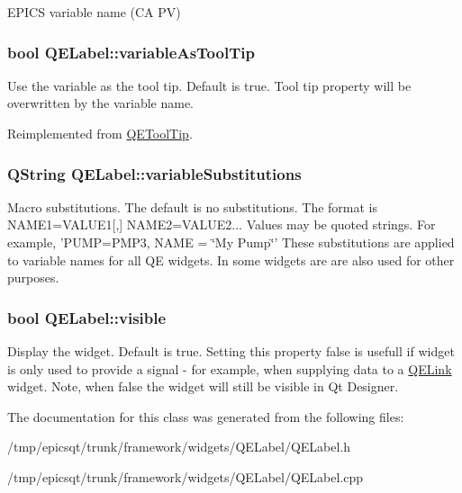 \label{classQELabel_a3ca3590d22697395ec79c29335987ed3}
EPICS variable name (CA PV) \hypertarget{classQELabel_a2729739c10c45d2c5462815dd32b194e}{
\subsubsection[{variableAsToolTip}]{\setlength{\rightskip}{0pt plus 5cm}bool QELabel::variableAsToolTip}}
\label{classQELabel_a2729739c10c45d2c5462815dd32b194e}
Use the variable as the tool tip. Default is true. Tool tip property will be overwritten by the variable name. 

Reimplemented from \hyperlink{classQEToolTip}{QEToolTip}.

\hypertarget{classQELabel_aeece637752023b268141770905bd3fa4}{
\subsubsection[{variableSubstitutions}]{\setlength{\rightskip}{0pt plus 5cm}QString QELabel::variableSubstitutions}}
\label{classQELabel_aeece637752023b268141770905bd3fa4}
Macro substitutions. The default is no substitutions. The format is NAME1=VALUE1\mbox{[},\mbox{]} NAME2=VALUE2... Values may be quoted strings. For example, 'PUMP=PMP3, NAME = \char`\"{}My Pump\char`\"{}' These substitutions are applied to variable names for all QE widgets. In some widgets are are also used for other purposes. \hypertarget{classQELabel_a76bf104bc1f839b9b6a9249931f3f023}{
\subsubsection[{visible}]{\setlength{\rightskip}{0pt plus 5cm}bool QELabel::visible}}
\label{classQELabel_a76bf104bc1f839b9b6a9249931f3f023}
Display the widget. Default is true. Setting this property false is usefull if widget is only used to provide a signal -\/ for example, when supplying data to a \hyperlink{classQELink}{QELink} widget. Note, when false the widget will still be visible in Qt Designer. 

The documentation for this class was generated from the following files:\begin{DoxyCompactItemize}
\item 
/tmp/epicsqt/trunk/framework/widgets/QELabel/QELabel.h\item 
/tmp/epicsqt/trunk/framework/widgets/QELabel/QELabel.cpp\end{DoxyCompactItemize}
